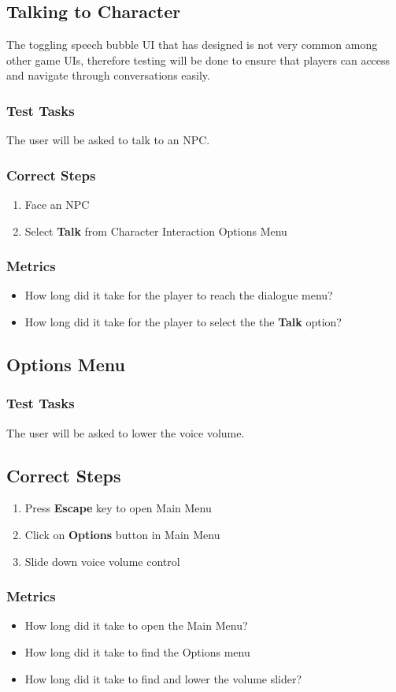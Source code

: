 \subsection{Talking to Character}
The toggling speech bubble UI that \ourteam{} has designed is not very common among other game UIs, therefore  testing will be done to ensure that players can access and navigate through conversations easily.

\subsubsection{Test Tasks}
The user will be asked to talk to an NPC.

\subsubsection{Correct Steps}
\begin{enumerate}
\item{Face an NPC}
\item{Select \textbf{Talk} from Character Interaction Options Menu}
\end{enumerate}

\subsubsection{Metrics}
\begin{itemize}
\item{How long did it take for the player to reach the dialogue menu?}
\item{How long did it take for the player to select the the \textbf{Talk} option?}
\end{itemize}





\subsection{Options Menu}

\subsubsection{Test Tasks}
The user will be asked to lower the voice volume.

\subsection{Correct Steps}
\begin{enumerate}
\item{Press \textbf{Escape} key to open Main Menu}
\item{Click on \textbf{Options} button in Main Menu}
\item{Slide down voice volume control}
\end{enumerate}

\subsubsection{Metrics}
\begin{itemize}
\item{How long did it take to open the Main Menu?}
\item{How long did it take to find the Options menu}
\item{How long did it take to find and lower the volume slider?}
\end{itemize}